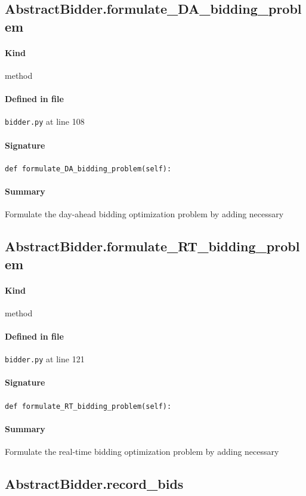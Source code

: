 \documentclass[11pt]{report}
\begin{document}
\subsection{AbstractBidder.formulate\_DA\_bidding\_problem}
\label{def:bidder.py:AbstractBidder.formulate_DA_bidding_problem:L108}
\paragraph{Kind} method
\paragraph{Defined in file} \texttt{bidder.py} at line 108
\paragraph{Signature} \texttt{def formulate\_DA\_bidding\_problem(self):}
\paragraph{Summary} Formulate the day-ahead bidding optimization problem by adding necessary
\subsection{AbstractBidder.formulate\_RT\_bidding\_problem}
\label{def:bidder.py:AbstractBidder.formulate_RT_bidding_problem:L121}
\paragraph{Kind} method
\paragraph{Defined in file} \texttt{bidder.py} at line 121
\paragraph{Signature} \texttt{def formulate\_RT\_bidding\_problem(self):}
\paragraph{Summary} Formulate the real-time bidding optimization problem by adding necessary
\subsection{AbstractBidder.record\_bids}
\label{def:bidder.py:AbstractBidder.record_bids:L134}
\end{document}
